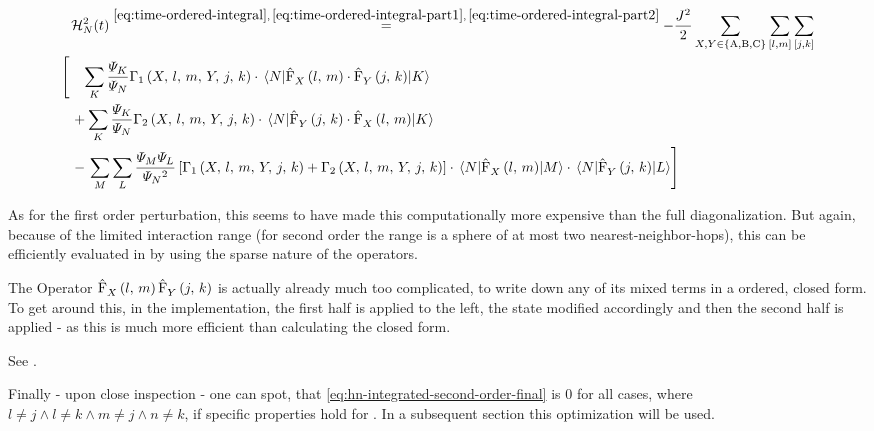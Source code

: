 \begin{equation}
    \label{eq:hn-integrated-second-order-final}
    \begin{split}
        &\HNOftOrder{2} \stackrel{\ref{eq:time-ordered-integral},\,\ref{eq:time-ordered-integral-part1},\,\ref{eq:time-ordered-integral-part2}}{=} 
        - \frac{J^2}{2} 
        \lsum[X,Y \in \left\{\text{A}, \text{B}, \text{C}\right\}] \fullneighborsum{l}{m}\fullneighborsum{j}{k}\\
        \left[         \vphantom{\lsum[K]}        \right.
        &\phantom{+}
        \lsum[K]
        \frac{\psiN[K]}{\psiN} 
        \Gamma_1 \left(X,\,l,\,m,\,Y,\,j,\,k\right)
        \cdot 
        \bracketHelper{N}{
            \VhamiltonianOperatorPart[]{$X$}{l}{m}
            \cdot 
            \VhamiltonianOperatorPart[]{$Y$}{j}{k}
            }{K}
        \\
        &+ 
        \lsum[K]
        \frac{\psiN[K]}{\psiN} 
        \Gamma_2 \left(X,\,l,\,m,\,Y,\,j,\,k\right)
        \cdot 
        \bracketHelper{N}{
            \VhamiltonianOperatorPart[]{$Y$}{j}{k}
        \cdot 
            \VhamiltonianOperatorPart[]{$X$}{l}{m}
        }{K} \\
        &-
        \left.
        \lsum[M]\lsum[L]
        \frac{\psiN[M]\psiN[L]}{\psiN{}^2}
            \left[\Gamma_1 \left(X,\,l,\,m,\,Y,\,j,\,k\right) + \Gamma_2 \left(X,\,l,\,m,\,Y,\,j,\,k\right)\right] \cdot
            \bracketHelper{N}{\VhamiltonianOperatorPart{$X$}{l}{m}}{M}
            \cdot
            \bracketHelper{N}{\VhamiltonianOperatorPart{$Y$}{j}{k}}{L}
        \right]
    \end{split}
\end{equation}

As for the first order perturbation, this seems to have made this computationally more expensive than the full diagonalization.
But again, because of the limited interaction range (for second order the range is a sphere of at most two nearest-neighbor-hops), this can be efficiently evaluated in 
 by using the sparse nature of the operators.

The Operator $\VhamiltonianOperatorPart[]{$X$}{l}{m}\VhamiltonianOperatorPart[]{$Y$}{j}{k}$ is actually already much too complicated, to write down any of its mixed terms in a ordered, closed form.
To get around this, in the implementation, the first half is applied to the left, the state modified accordingly and then the second half is applied - as this is much more efficient than calculating the closed form.

See .

Finally - upon close inspection - one can spot, that \autoref{eq:hn-integrated-second-order-final} is $0$ for all cases, where $l \neq j \land l \neq k \land m \neq j \land n \neq k$, if specific properties hold for \psiN[\ast].
In a subsequent section this optimization will be used.